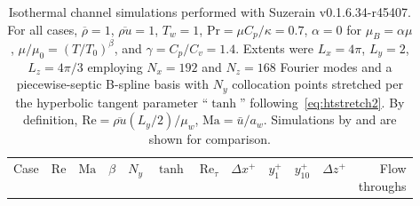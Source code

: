 

\begin{table}
\makecommand{\z}{\phantom{0}}  %
\makecommand{\Z}{\phantom{.0}} %
\centering
\caption[Isothermal channel simulations]{%
    Isothermal channel simulations performed with Suzerain
    v0.1.6.34-r45407.  For all cases, $\overline{\rho} = 1$,
    $\overline{\rho{} u} = 1$, $T_w = 1$, $\textrm{Pr} = \mu C_p
    / \kappa = 0.7$, $\alpha=0$ for $\mu_B=\alpha\mu$, $\mu /
    \mu_0={\left(T / T_0\right)}^\beta$, and $\gamma = C_p / C_v =
    1.4$.  Extents were $L_x=4\pi$, $L_y=2$, $L_z=4\pi/3$ employing
    $N_x=192$ and $N_z=168$ Fourier modes and a piecewise-septic
    B-spline basis with $N_y$ collocation points stretched per
    the hyperbolic tangent parameter ``$\tanh$'' following~\eqref{eq:htstretch2}.  By definition,
    $\textrm{Re} = \overline{\rho{}u}\left(L_y / 2\right) / \mu_w$,
    $\textrm{Ma} = \bar{u} / a_w$.  Simulations by
    \citet*{Kim1987Turbulence} and \citet*{Coleman1995Numerical} are
    shown for comparison.\label{tbl:table_channel}
}
{\renewcommand{\tabcolsep}{0.435em}
\begin{tabular}{cccccccccccr}
Case                                     & %
$\textrm{Re}$                            &
$\textrm{Ma}$                            &
$\beta$                                  &
$N_y$                                    &
$\tanh$                                  &
$\textrm{Re}_\tau$                       & %
$\Delta{}x^{+}$                          &
$y_{1}^{+}$                              &
$y_{10}^{+}$                             &
$\Delta{}z^{+}$                          &
\shortstack[c]{Flow\\throughs}

\end{tabular}}
\end{table}
